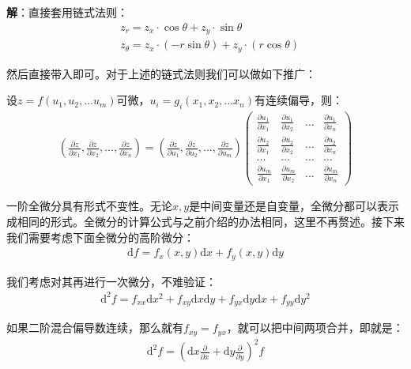 \documentclass{ctexart}
\let\oldtextbf\textbf %
\renewcommand{\textbf}[1]{\textcolor{btex}{\oldtextbf{#1}}} %
\begin{document}
\textbf{解}：直接套用链式法则：
\begin{align*}
    &z_r=z_x\cdot \cos\theta+z_y\cdot\sin\theta\\
    &z_\theta=z_x\cdot(-r\sin\theta)+z_y\cdot (r\cos\theta)
\end{align*}

然后直接带入即可。对于上述的链式法则我们可以做如下推广：
\begin{tcolorbox}[
    colback=bac1,     %
    colframe=fra1,   %
    coltitle=white,             %
    coltext=tex1,
    title=链式法则的推广,
    fonttitle=\bfseries,        %
arc=3mm,                     %
breakable
]
设$z=f(u_1,u_2,...u_m)$可微，$u_i=g_i(x_1,x_2,...x_n)$有连续偏导，则：
\begin{align*}
(\frac{\partial z}{\partial x_1}, \frac{\partial z}{\partial x_2},...,\frac{\partial z}{\partial x_n})
=(\frac{\partial z}{\partial u_1},\frac{\partial z}{\partial u_2},...,\frac{\partial z}{\partial u_m})
\begin{pmatrix}
 \frac{\partial u_1}{\partial x_1} & \frac{\partial u_1}{\partial x_2} & ... & \frac{\partial u_1}{\partial x_n}\\
 \frac{\partial u_2}{\partial x_1}  &  \frac{\partial u_2}{\partial x_2} & ... &  \frac{\partial u_2}{\partial x_n}\\
 ... & ... & ... & ...\\
  \frac{\partial u_m}{\partial x_1} & \frac{\partial u_m}{\partial x_2} & ... &\frac{\partial u_m}{\partial x_n}
\end{pmatrix}  \tag{7-8}
\end{align*}
\end{tcolorbox}

一阶全微分具有形式不变性。无论$x,y$是中间变量还是自变量，全微分都可以表示成相同的形式。全微分的计算公式与之前介绍的办法相同，这里不再赘述。接下来我们需要考虑下面全微分的高阶微分：
\begin{align*}
    \mathrm{d}f=f_x(x,y)\mathrm{d}x+f_y(x,y)\mathrm{d}y
\end{align*}

我们考虑对其再进行一次微分，不难验证：
\begin{align*}
\mathrm{d}^2f=f_{xx}\mathrm{d}x^2+f_{xy}\mathrm{d}x\mathrm{d}y+f_{yx}\mathrm{d}y\mathrm{d}x+f_{yy}\mathrm{d}y^2
\end{align*}

如果二阶混合偏导数连续，那么就有$f_{xy}=f_{yx}$，就可以把中间两项合并，即就是：
\begin{align*}
    \mathrm{d}^2f=(\mathrm{d}x\frac{\partial }{\partial x}+\mathrm{d}y\frac{\partial}{\partial y})^2f
\end{align*}
\end{document}
